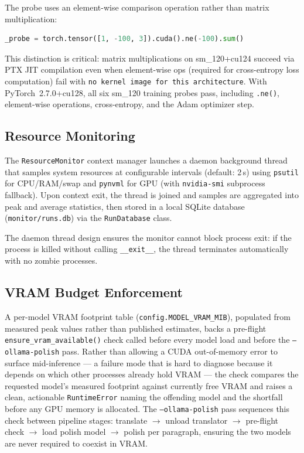 \documentclass[conference]{IEEEtran}
\begin{document}
The probe uses an element-wise comparison operation rather than matrix multiplication:

\begin{lstlisting}[language=Python, caption={Training CUDA probe (not matmul).}]
_probe = torch.tensor([1, -100, 3]).cuda().ne(-100).sum()
\end{lstlisting}

This distinction is critical: matrix multiplications on sm\_120+cu124 succeed via
PTX JIT compilation even when element-wise ops (required for cross-entropy loss
computation) fail with \texttt{no kernel image for this architecture}.
With PyTorch~2.7.0+cu128, all six sm\_120 training probes pass, including
\texttt{.ne()}, element-wise operations, cross-entropy, and the Adam optimizer step.

\subsection{Resource Monitoring}

The \texttt{ResourceMonitor} context manager launches a daemon background thread that
samples system resources at configurable intervals (default: 2\,s) using \texttt{psutil}
for CPU/RAM/swap and \texttt{pynvml} for GPU (with \texttt{nvidia-smi} subprocess
fallback). Upon context exit, the thread is joined and samples are aggregated into
peak and average statistics, then stored in a local SQLite database
(\texttt{monitor/runs.db}) via the \texttt{RunDatabase} class.

The daemon thread design ensures the monitor cannot block process exit: if the process
is killed without calling \texttt{\_\_exit\_\_}, the thread terminates automatically
with no zombie processes.

\subsection{VRAM Budget Enforcement}
\label{sec:vrambudget}

A per-model VRAM footprint table (\texttt{config.MODEL\_VRAM\_MIB}), populated from
measured peak values rather than published estimates, backs a pre-flight
\texttt{ensure\_vram\_available()} check called before every model load and before
the \texttt{--ollama-polish} pass. Rather than allowing a CUDA out-of-memory error
to surface mid-inference --- a failure mode that is hard to diagnose because it
depends on which other processes already hold VRAM --- the check compares the
requested model's measured footprint against currently free VRAM and raises a
clean, actionable \texttt{RuntimeError} naming the offending model and the shortfall
before any GPU memory is allocated. The \texttt{--ollama-polish} pass sequences this
check between pipeline stages: translate $\to$ unload translator $\to$ pre-flight
check $\to$ load polish model $\to$ polish per paragraph, ensuring the two models
are never required to coexist in VRAM.
\end{document}
